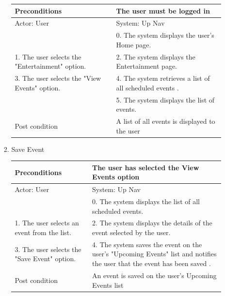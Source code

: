 \documentclass{article}
\begin{document}
\begin{enumerate}
\begin{center}
\begin{enumerate}
\begin{enumerate}
	\begin{table}[H]
	\centering
		\begin{tabular}{ | p{15em} | p{15em}| }
		\hline
		Preconditions                                                       				& The user must be logged in \\ 				
		\hline
		Actor: User                                                       					& System: Up Nav \\ 			
		\hline
                                                                  							& 0. The system displays the user's Home page. \\                                                           
		 \hline
		1. The user selects the "Entertainment" option.				& 2. The system displays the Entertainment  page. \\
		 \hline
		3. The user selects the "View Events" option. 					& 4.  The system retrieves a list of all scheduled events . \\
		\hline
													& 5. The system displays the list of events. \\
		\hline
		Post condition                                                     				& A list of all events is displayed to the user \\ 			
		\hline
		\end{tabular}
	\end{table}

	\item{Save Event}

	\begin{table}[H]
	\centering
		\begin{tabular}{ | p{15em} | p{15em}| }
		\hline
		Preconditions                                                       				& The user has selected the View Events option \\ 				
		\hline
		Actor: User                                                       					& System: Up Nav \\ 			
		\hline
                                                                  							& 0. The system displays the list of all scheduled events. \\                                                           
		 \hline
		1. The user selects an event from the list.					& 2. The system displays the details of the event selected by the user. \\
		 \hline
		3. The user selects the "Save Event" option. 					& 4.  The system saves the event on the user's "Upcoming Events" list and notifies the user that the event has been saved . \\
		\hline
		Post condition                                                     				& An event is saved on the user's Upcoming Events list \\ 			
		\hline
		\end{tabular}
	\end{table}


\end{enumerate}
\end{enumerate}
\end{center}
\end{enumerate}
\end{document}
